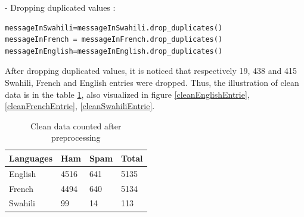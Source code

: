 \documentclass[12pt,a4paper, oneside]{book}
\begin{document}
- Dropping duplicated values :
\begin{lstlisting}[style=stylejupyter]
messageInSwahili=messageInSwahili.drop_duplicates() 
messageInFrench = messageInFrench.drop_duplicates() 
messageInEnglish=messageInEnglish.drop_duplicates()  
\end{lstlisting}
After dropping duplicated values, it is noticed that respectively 19, 438 and 415  Swahili, French and English entries were dropped. Thus, the illustration of clean data is in the table \ref{cleandatacollected}, also visualized in figure \ref{cleanEnglishEntrie},  \ref{cleanFrenchEntrie}, \ref{cleanSwahiliEntrie}.
\begin{table}[h!]
	\centering
	\begin{tabular}{|p{3cm}|p{3.5cm}|p{3cm}|p{4cm}|} 
		\hline
		Languages & Ham  & Spam & Total\\
		\hline
		English & 4516 & 641  & 5135  \\
		\hline
		French&  4494 & 640 & 5134\\ 
		\hline
		Swahili & 99 & 14 & 113 \\
		\hline 
	\end{tabular}
		\caption{Clean data counted after preprocessing} 
	\label{cleandatacollected}
\end{table}
 
\end{document}
